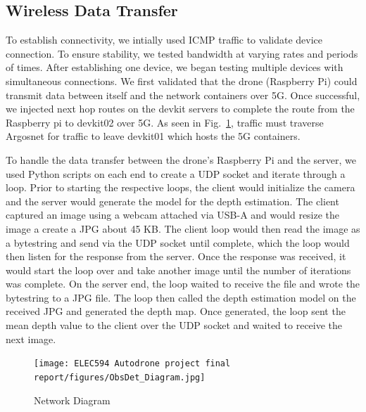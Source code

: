 \documentclass[conference]{IEEEtran}
\begin{document}
\subsection{Wireless Data Transfer}
To establish connectivity, we intially used ICMP traffic to validate device connection. To ensure stability, we tested bandwidth at varying rates and periods of times. After establishing one device, we began testing multiple devices with simultaneous connections. We first validated that the drone (Raspberry Pi) could transmit data between itself and the network containers over 5G. Once successful, we injected next hop routes on the devkit servers to complete the route from the Raspberry pi to devkit02 over 5G. As seen in Fig.~\ref{NetDiag}, traffic must traverse Argosnet for traffic to leave devkit01 which hosts the 5G containers. 



To handle the data transfer between the drone's Raspberry Pi and the server, we used Python scripts on each end to create a UDP socket and iterate through a loop. Prior to starting the respective loops, the client would initialize the camera and the server would generate the model for the depth estimation. The client captured an image using a webcam attached via USB-A and would resize the image a create a JPG about 45 KB. The client loop would then read the image as a bytestring and send via the UDP socket until complete, which the loop would then listen for the response from the server. Once the response was received, it would start the loop over and take another image until the number of iterations was complete. On the server end, the loop waited to receive the file and wrote the bytestring to a JPG file. The loop then called the depth estimation model on the received JPG and generated the depth map. Once generated, the loop sent the mean depth value to the client over the UDP socket and waited to receive the next image. 

\begin{figure}[h]
    \centering
    {\texttt{[image: ELEC594 Autodrone project final report/figures/ObsDet\_Diagram.jpg]}}
    \caption{Network Diagram}
    \label{NetDiag}
\end{figure}
\end{document}
